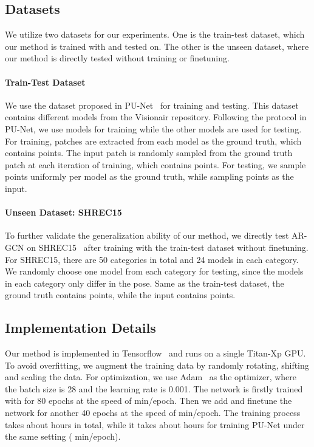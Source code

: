 \documentclass[10pt,twocolumn,letterpaper]{article}
\begin{document}
\subsection{Datasets}
We utilize two datasets for our experiments.
One is the train-test dataset, which our method is trained with and tested on.
The other is the unseen dataset, where our method is directly tested without training or finetuning.

\vspace{-1em}
\paragraph{Train-Test Dataset}
We use the dataset proposed in PU-Net~\cite{yu2018pu} for training and testing.
This dataset contains  different models from the Visionair repository.
Following the protocol in PU-Net, we use  models for training while the other  models are used for testing.
For training,  patches are extracted from each model as the ground truth, which contains  points.
The input patch is randomly sampled from the ground truth patch at each iteration of training, which contains  points.
For testing, we sample  points uniformly per model as the ground truth, while sampling  points as the input.

\vspace{-1em}
\paragraph{Unseen Dataset: SHREC15} To further validate the generalization ability of our method, we directly test AR-GCN on SHREC15~\cite{Lian:2015:NSR:2852282.2852307} after training with the train-test dataset without finetuning.
For SHREC15, there are 50 categories in total and 24 models in each category.
We randomly choose one model from each category for testing, since the models in each category only differ in the pose.
Same as the train-test dataset, the ground truth contains  points, while the input contains  points.

\subsection{Implementation Details}
\label{sec:training}
Our method is implemented in Tensorflow~\cite{abadi2016tensorflow} and runs on a single Titan-Xp GPU.
To avoid overfitting, we augment the training data by randomly rotating, shifting and scaling the data.
For optimization, we use Adam~\cite{kingma2014adam} as the optimizer, where the batch size is 28 and the learning rate is 0.001.
The network is firstly trained with  for 80 epochs at the speed of  min/epoch.
Then we add  and finetune the network for another 40 epochs at the speed of  min/epoch.
The training process takes about  hours in total, while it takes about  hours for training PU-Net under the same setting ( min/epoch).
\end{document}
